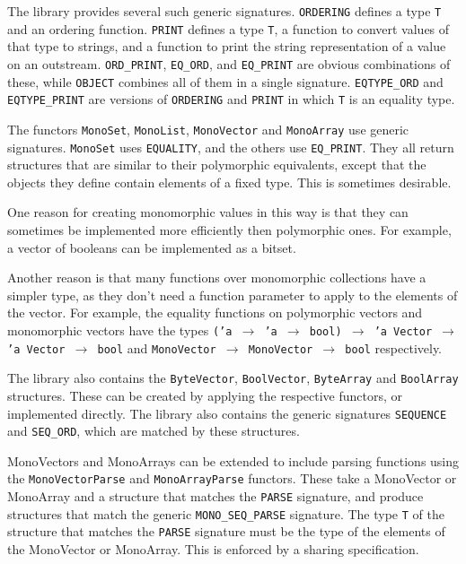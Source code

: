 The library provides several such generic signatures.  {\tt ORDERING}
defines a type {\tt T} and an ordering function.  {\tt PRINT} defines
a type {\tt T}, a function to convert values of that type to strings,
and a function to print the string representation of a value on an
outstream.  {\tt ORD\_PRINT}, {\tt EQ\_ORD}, and {\tt EQ\_PRINT} are
obvious combinations of these, while {\tt OBJECT} combines all of
them in a single signature.  {\tt EQTYPE\_ORD} and {\tt EQTYPE\_PRINT}
are versions of {\tt ORDERING} and {\tt PRINT} in which {\tt T} is an
equality type.   

The functors {\tt MonoSet}, {\tt MonoList}, {\tt MonoVector} and
{\tt MonoArray} use generic signatures.  {\tt MonoSet} uses {\tt EQUALITY},
and the others use {\tt EQ\_PRINT}.  They all return structures that
are similar to their polymorphic equivalents, except that the objects
they define contain elements of a fixed type.  This is sometimes
desirable.

One reason for creating monomorphic values in this way is that they
can sometimes be implemented more efficiently then
polymorphic ones.
For example, a vector of booleans can be implemented as a bitset.

Another reason is that many functions over monomorphic collections
have a simpler type, as they
don't need a function parameter to apply to the elements of the vector.
For example, the equality functions on polymorphic vectors and monomorphic
vectors have the types
{\tt ('a $\rightarrow$ 'a $\rightarrow$ bool) 
$\rightarrow$ 'a Vector $\rightarrow$ 'a Vector $\rightarrow$ bool}
and {\tt MonoVector $\rightarrow$ MonoVector $\rightarrow$ bool}
respectively.

The library also contains the {\tt ByteVector}, {\tt BoolVector},
{\tt ByteArray} and {\tt BoolArray} structures.  These can be created
by applying
the respective functors, or implemented directly.
The library also contains the generic signatures {\tt SEQUENCE} and
{\tt SEQ\_ORD}, which are matched by these structures.

MonoVectors and MonoArrays can be extended to include parsing functions
using the {\tt MonoVectorParse} and {\tt MonoArrayParse} functors.
These take a MonoVector or MonoArray and a structure that matches the
{\tt PARSE} signature, and produce structures that match the generic
{\tt MONO\_SEQ\_PARSE} signature.  The type {\tt T} of the structure
that matches the {\tt PARSE} signature must be the type of the elements
of the MonoVector or MonoArray.  This is enforced by a sharing specification.

